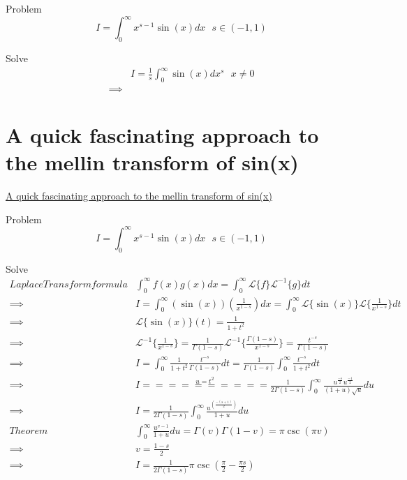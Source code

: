 \documentclass {article}
\begin{document}
Problem 
\[
  I = \int_0^{\infty} x^{s-1}\sin(x){d}x  \text{    }  s \in \left(-1,1\right)
\]

Solve
\[
\begin{matrix}
      & I = \frac{1}{s} \int_0^{\infty} \sin(x){d} x^{s}  \text{   } x \ne 0 \\  
\implies       & 
\end{matrix}
\]

\section{A quick fascinating approach to the mellin transform of sin(x)}
\href{https://www.youtube.com/watch?v=P5Wc6DxUciw}{A quick fascinating approach to the mellin transform of sin(x)}

Problem 
\[
  I = \int_0^{\infty} x^{s-1}\sin(x){d}x  \text{    }  s \in \left(-1,1\right)
\]

Solve
\[
\begin{matrix}
 Laplace Transform formula & \int_0^{\infty} f(x)g(x) {d}x = \int_0^{\infty} \mathcal{L}\{f\}\mathcal{L}^{-1}\{g\} {d}t \\
\implies & I = \int_0^{\infty} \left(\sin(x)\right) \left(\frac{1}{x^{1-s}}\right) {d}x = \int_0^{\infty} \mathcal{L}\{\sin(x)\}\mathcal{L}\{\frac{1}{x^{1-s}}\}{d}t \\
\implies & \mathcal{L}\{\sin(x)\}(t) = \frac{1}{1+t^2} \\
\implies & \mathcal{L}^{-1}\{\frac{1}{x^{1-s}}\} = \frac{1}{\Gamma(1-s)} \mathcal{L}^{-1}\{\frac{\Gamma(1-s)}{x^{1-s}}\} = \frac{t^{-s}}{\Gamma(1-s)} \\
\implies & I = \int_0^{\infty} \frac{1}{1+t^2} \frac{t^{-s}}{\Gamma(1-s)}{d}t = \frac{1}{\Gamma(1-s)} \int_0^{\infty} \frac{t^{-s}}{1+t^2} {d}t \\
\implies & I \stackrel{u = t ^2}{==========} \frac{1}{2\Gamma(1-s)} \int_0^{\infty} \frac{u^{\frac{-s}{2}}  u ^{\frac{-1}{2}}}{(1+u)\sqrt{u}} {d}u \\
\implies & I = \frac{1}{2\Gamma(1-s)} \int_0^{\infty} \frac{u^{\left(\frac{-(s+1)}{2}\right)}}{1+u}{d}u \\

Theorem & \int_0^{\infty} \frac{u^{v-1}}{1+u} {d}u = \Gamma(v)\Gamma(1-v) = \pi\csc(\pi v) \\
\implies & v = \frac{1-s}{2} \\
\implies & I = \frac{1} {2 \Gamma(1-s)} \pi \csc(\frac{\pi}{2} - \frac{\pi s}{2}) \\
\end{matrix}
\]
\end{document}
